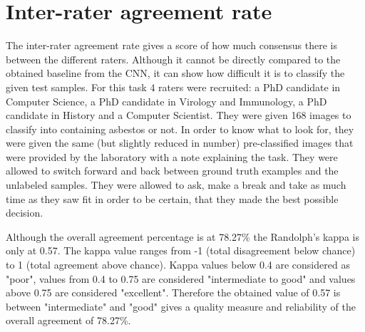\section{Inter-rater agreement rate}

The inter-rater agreement rate gives a score of how much consensus there is between the different raters. Although it cannot be directly compared to the obtained baseline from the CNN, it can show how difficult it is to classify the given test samples. For this task 4 raters were recruited: a PhD candidate in Computer Science, a PhD candidate in Virology and Immunology, a PhD candidate in History and a Computer Scientist. They were given 168 images to classify into containing asbestos or not. In order to know what to look for, they were given the same (but slightly reduced in number) pre-classified images that were provided by the laboratory with a note explaining the task. They were allowed to switch forward and back between ground truth examples and the unlabeled samples. They were allowed to ask, make a break and take as much time as they saw fit in order to be certain, that they made the best possible decision.\\


\begin{table}[!h] \centering
{}
\caption{Inter-rater agreement rate (Randolph's kappa) of 4 annotators.}
\label{tbl:interagreement}
\end{table}

\quad

Although the overall agreement percentage is at 78.27\% the Randolph's kappa is only at 0.57. The kappa value ranges from -1 (total disagreement below chance) to 1 (total agreement above chance). Kappa values below 0.4 are considered as "poor", values from 0.4 to 0.75  are considered "intermediate to good" and values  above 0.75 are considered "excellent". Therefore the obtained value of 0.57 is between "intermediate" and "good" gives a quality measure and reliability of the overall agreement of 78.27\%. \\











